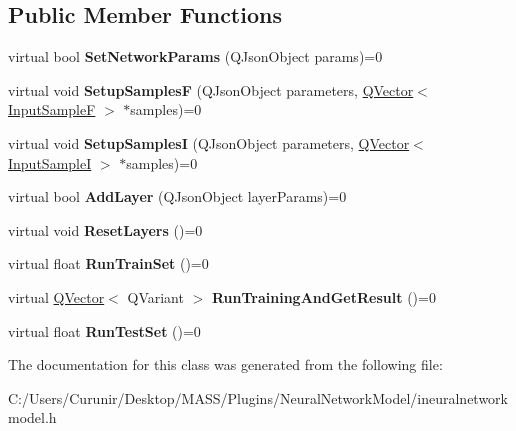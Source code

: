 \subsection*{Public Member Functions}
\begin{DoxyCompactItemize}
\item 
\mbox{\label{class_i_neural_network_model_1_1_i_neural_network_a21b05dafd766b32341d22b52d4714903}} 
virtual bool {\bfseries Set\+Network\+Params} (Q\+Json\+Object params)=0
\item 
\mbox{\label{class_i_neural_network_model_1_1_i_neural_network_a840c7196b8c3e1065b8c0a62a1b49fb2}} 
virtual void {\bfseries Setup\+SamplesF} (Q\+Json\+Object parameters, \hyperlink{class_q_vector}{Q\+Vector}$<$ \hyperlink{class_q_pair}{Input\+SampleF} $>$ $\ast$samples)=0
\item 
\mbox{\label{class_i_neural_network_model_1_1_i_neural_network_af04047a560d8b5f68651173f62510d02}} 
virtual void {\bfseries Setup\+SamplesI} (Q\+Json\+Object parameters, \hyperlink{class_q_vector}{Q\+Vector}$<$ \hyperlink{class_q_pair}{Input\+SampleI} $>$ $\ast$samples)=0
\item 
\mbox{\label{class_i_neural_network_model_1_1_i_neural_network_a128bb0ed83f4b3b309691943eca77954}} 
virtual bool {\bfseries Add\+Layer} (Q\+Json\+Object layer\+Params)=0
\item 
\mbox{\label{class_i_neural_network_model_1_1_i_neural_network_a0940ee0d739ae2ea00eb28ef21019597}} 
virtual void {\bfseries Reset\+Layers} ()=0
\item 
\mbox{\label{class_i_neural_network_model_1_1_i_neural_network_adbfcfb4e09800b0f32f141b071eca3d8}} 
virtual float {\bfseries Run\+Train\+Set} ()=0
\item 
\mbox{\label{class_i_neural_network_model_1_1_i_neural_network_a4f00d2ce86d5e006f161762ad7631d3b}} 
virtual \hyperlink{class_q_vector}{Q\+Vector}$<$ Q\+Variant $>$ {\bfseries Run\+Training\+And\+Get\+Result} ()=0
\item 
\mbox{\label{class_i_neural_network_model_1_1_i_neural_network_a767cdb2dfd88c7db1dfbd8620cffafc9}} 
virtual float {\bfseries Run\+Test\+Set} ()=0
\end{DoxyCompactItemize}


The documentation for this class was generated from the following file\+:\begin{DoxyCompactItemize}
\item 
C\+:/\+Users/\+Curunir/\+Desktop/\+M\+A\+S\+S/\+Plugins/\+Neural\+Network\+Model/ineuralnetworkmodel.\+h\end{DoxyCompactItemize}
